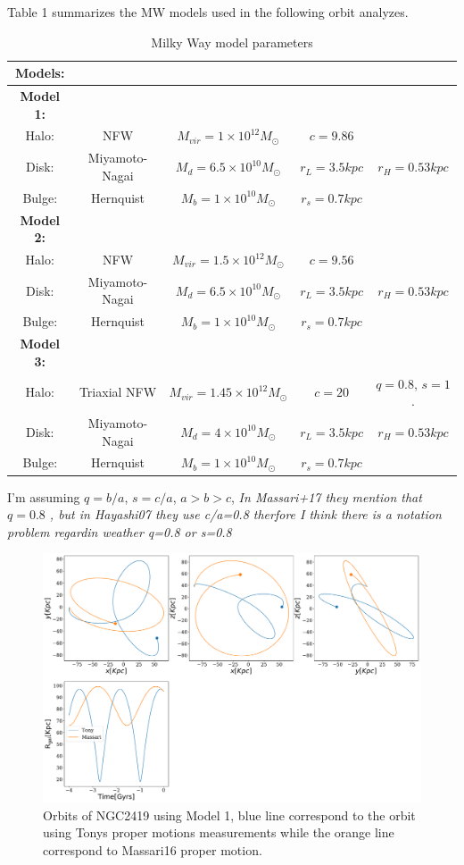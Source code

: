 \documentclass[14pt]{article}
\begin{document}
Table 1 summarizes the MW models used in the following orbit analyzes.

\begin{table}[H]
\centering
\begin{tabular}{c c c c c}
\hline
\hline
\textbf{Models:} & & & & \\
\hline
\textbf{Model 1:} & & & & \\
Halo: & NFW & $M_{vir} = 1\times 10^{12} M_{\odot}$ & $c=9.86$  \\
Disk: & Miyamoto-Nagai & $M_{d} = 6.5\times10^{10} M_{\odot}$ & $r_L = 3.5 kpc$ & $r_H = 0.53 kpc$ \\
Bulge: & Hernquist & $M_b = 1 \times 10^{10} M_{\odot}$ & $r_s=0.7 kpc$ & \\
\hline
\textbf{Model 2:} & & & & \\
Halo: & NFW & $M_{vir} = 1.5\times 10^{12} M_{\odot}$ & $c=9.56$  \\
Disk: & Miyamoto-Nagai & $M_{d} = 6.5\times10^{10} M_{\odot}$ & $r_L = 3.5 kpc$ & $r_H = 0.53 kpc$ \\
Bulge: & Hernquist & $M_b = 1 \times 10^{10} M_{\odot}$ & $r_s=0.7 kpc$ & \\
\hline
\textbf{Model 3:} & & & & \\
Halo: & Triaxial NFW & $M_{vir} = 1.45\times 10^{12} M_{\odot}$ &
$c=20$  & $q=0.8$, $s=1$. \\
Disk: & Miyamoto-Nagai & $M_{d} = 4\times10^{10} M_{\odot}$ & $r_L = 3.5 kpc$ & $r_H = 0.53 kpc$ \\
Bulge: & Hernquist & $M_b = 1 \times 10^{10} M_{\odot}$ & $r_s=0.7 kpc$ & \\
\hline
\hline
\end{tabular}
\caption{Milky Way model parameters}
\end{table}

I'm assuming $q=b/a$, $s=c/a$, $a>b>c$, \textit{In Massari+17 they
mention that $q=0.8$ , but in Hayashi07 they use c/a=0.8 therfore I
think there is a notation problem regardin weather q=0.8 or s=0.8 }


\begin{figure}[H]
\centering
\includegraphics[scale=0.3]{../exploratory_code/NGC2419_sphMW.pdf}
\caption{Orbits of NGC2419 using Model 1, blue line correspond to
the orbit using Tonys proper motions measurements while the orange line correspond to
Massari16 proper motion.}
\end{figure}
\end{document}
